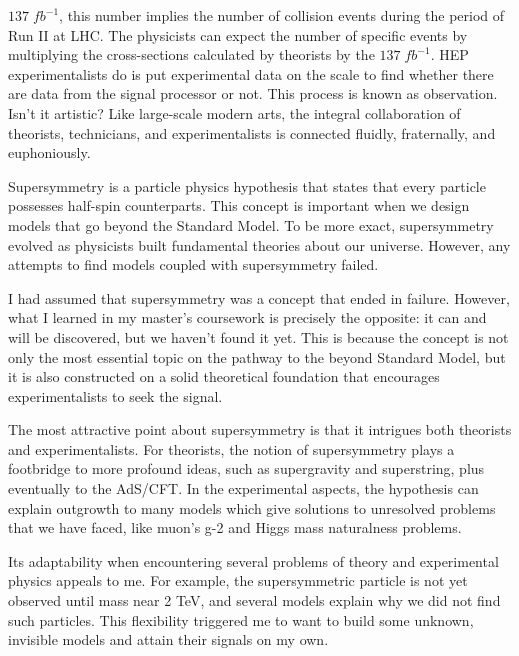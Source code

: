 
$137 \; fb^{-1}$, this number implies the number of collision events during the period of Run II at LHC. The physicists can expect the number of specific events by multiplying the cross-sections calculated by theorists by the $137 \; fb^{-1}$. HEP experimentalists do is put experimental data on the scale to find whether there are data from the signal processor or not. This process is known as observation. Isn't it artistic? Like large-scale modern arts, the integral collaboration of theorists, technicians, and experimentalists is connected fluidly, fraternally, and euphoniously.

Supersymmetry is a particle physics hypothesis that states that every particle possesses half-spin counterparts. This concept is important when we design models that go beyond the Standard Model. To be more exact, supersymmetry evolved as physicists built fundamental theories about our universe. However, any attempts to find models coupled with supersymmetry failed.

I had assumed that supersymmetry was a concept that ended in failure. However, what I learned in my master's coursework is precisely the opposite: it can and will be discovered, but we haven't found it yet. This is because the concept is not only the most essential topic on the pathway to the beyond Standard Model, but it is also constructed on a solid theoretical foundation that encourages experimentalists to seek the signal.

The most attractive point about supersymmetry is that it intrigues both theorists and experimentalists. For theorists, the notion of supersymmetry plays a footbridge to more profound ideas, such as supergravity and superstring, plus eventually to the AdS/CFT. In the experimental aspects, the hypothesis can explain outgrowth to many models which give solutions to unresolved problems that we have faced, like muon's g-2 and Higgs mass naturalness problems.

Its adaptability when encountering several problems of theory and experimental physics appeals to me. For example, the supersymmetric particle is not yet observed until mass near 2 TeV, and several models explain why we did not find such particles. This flexibility triggered me to want to build some unknown, invisible models and attain their signals on my own. 


